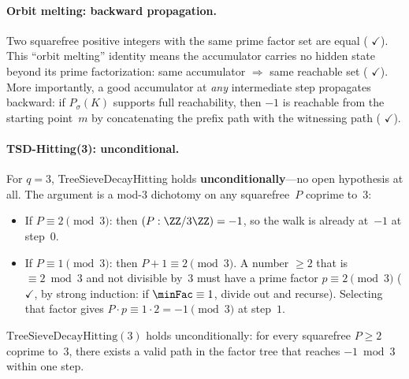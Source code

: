 \paragraph{Orbit melting: backward propagation.}
Two squarefree positive integers with the same prime factor set are
equal
(
{\color{leanink}$\checkmark$}).
This ``orbit melting'' identity means the accumulator carries no
hidden state beyond its prime factorization:
same accumulator $\Rightarrow$ same reachable set
(
{\color{leanink}$\checkmark$}).
More importantly, a good accumulator at \emph{any} intermediate step
propagates backward: if $P_\sigma(K)$ supports full reachability,
then $-1$ is reachable from the starting point~$m$ by concatenating
the prefix path with the witnessing path
(
{\color{leanink}$\checkmark$}).

\paragraph{TSD-Hitting(3): unconditional.}
For $q = 3$, TreeSieveDecayHitting holds \textbf{unconditionally}---no
open hypothesis at all.  The argument is a mod-$3$ dichotomy on any
squarefree~$P$ coprime to~$3$:
\begin{itemize}
\item If $P \equiv 2 \pmod{3}$: then $(P : \ZZ/3\ZZ) = -1$, so the
  walk is already at~$-1$ at step~$0$.
\item If $P \equiv 1 \pmod{3}$: then $P{+}1 \equiv 2 \pmod{3}$.
  A number $\geq 2$ that is $\equiv 2 \bmod 3$ and not divisible by~$3$
  must have a prime factor $p \equiv 2 \pmod{3}$
  (
  {\color{leanink}$\checkmark$},
  by strong induction: if $\minFac \equiv 1$, divide out and recurse).
  Selecting that factor gives $P \cdot p \equiv 1 \cdot 2 = -1 \pmod{3}$
  at step~$1$.
\end{itemize}
\begin{keyresult}
\begin{theorem}
$\mathrm{TreeSieveDecayHitting}(3)$ holds unconditionally: for every
squarefree $P \geq 2$ coprime to~$3$, there exists a valid path in
the factor tree that reaches $-1 \bmod 3$ within one step.
\end{theorem}
\end{keyresult}

